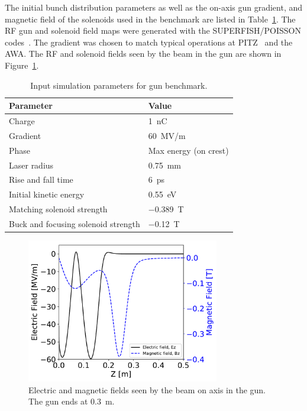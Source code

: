 The initial bunch distribution parameters as well as the 
on-axis gun gradient, and magnetic field of the solenoids used in 
the benchmark are listed in Table~\ref{tab:bench}. 
The RF gun and solenoid field maps were generated 
with the SUPERFISH/POISSON  codes~\cite{superfish}.
The gradient was chosen to match typical operations at PITZ~\cite{pitz}
and the AWA. The RF and solenoid fields seen by the beam in the gun are shown in Figure~\ref{fig:gunfields}.
\begin{table}
	\begin{center}
		\caption{Input simulation parameters for gun benchmark.}
		\label{tab:bench}
		\begin{tabular}{l l} 
	\toprule
	\toprule
	\textbf{Parameter} & \textbf{Value} \\ 
	\midrule
	Charge  & \SI{1}{nC} \\
	Gradient & \SI{60}{MV/m} \\
	
	Phase & Max energy (on crest) \\
	
	Laser radius & \SI{0.75}{mm} \\
	
	Rise and fall time & \SI{6}{ps} \\
	
	Initial kinetic energy & \SI{0.55}{eV} \\
	
	Matching solenoid strength & \SI{-0.389}{T} \\
	
	Buck and focusing solenoid strength & \SI{-0.12}{T} \\
	\bottomrule			
\end{tabular}
	\end{center}
\end{table}
\begin{figure}
	\begin{center}
		\includegraphics[width=0.75\textwidth]{images/gun_EM_fields}
		\caption{Electric and magnetic fields seen by the beam on axis in the gun. 
			The gun ends at \SI{0.3}{m}. }
		\label{fig:gunfields}
	\end{center}
\end{figure}

